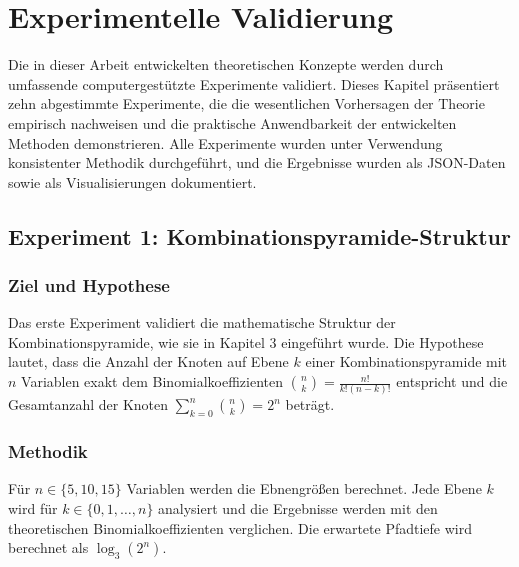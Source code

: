 ﻿\documentclass[a4paper,12pt]{article}
\theoremstyle{definition}
\begin{document}

\section{Experimentelle Validierung}

Die in dieser Arbeit entwickelten theoretischen Konzepte werden durch umfassende computergestützte Experimente validiert. Dieses Kapitel präsentiert zehn abgestimmte Experimente, die die wesentlichen Vorhersagen der Theorie empirisch nachweisen und die praktische Anwendbarkeit der entwickelten Methoden demonstrieren. Alle Experimente wurden unter Verwendung konsistenter Methodik durchgeführt, und die Ergebnisse wurden als JSON-Daten sowie als Visualisierungen dokumentiert.


\subsection{Experiment 1: Kombinationspyramide-Struktur}
\label{exp:pyramide}

\subsubsection{Ziel und Hypothese}

Das erste Experiment validiert die mathematische Struktur der Kombinationspyramide, wie sie in Kapitel 3 eingeführt wurde. Die Hypothese lautet, dass die Anzahl der Knoten auf Ebene $k$ einer Kombinationspyramide mit $n$ Variablen exakt dem Binomialkoeffizienten $\binom{n}{k} = \frac{n!}{k!(n-k)!}$ entspricht und die Gesamtanzahl der Knoten $\sum_{k=0}^n \binom{n}{k} = 2^n$ beträgt.

\subsubsection{Methodik}

Für $n \in \{5, 10, 15\}$ Variablen werden die Ebnengrößen berechnet. Jede Ebene $k$ wird für $k \in \{0, 1, \ldots, n\}$ analysiert und die Ergebnisse werden mit den theoretischen Binomialkoeffizienten verglichen. Die erwartete Pfadtiefe wird berechnet als $\log_3(2^n)$.
\end{document}
